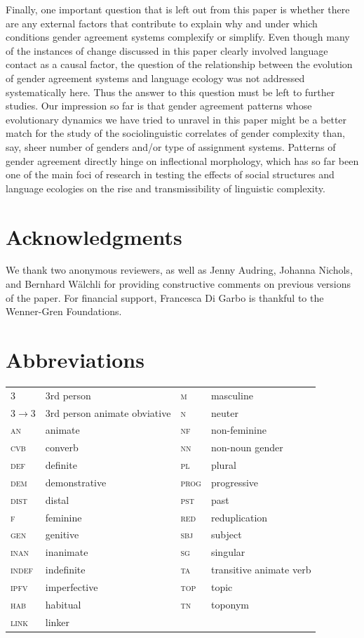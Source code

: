 \documentclass[output=collectionpaper]{langsci/langscibook}
\begin{document}
Finally, one important question that is left out from this paper is whether there are any external factors that contribute to explain why and under which conditions gender agreement systems complexify or simplify. Even though many of the instances of change discussed in this paper clearly involved language contact as a causal factor, the question of the relationship between the evolution of gender agreement systems and language ecology  was not addressed systematically here. Thus the answer to this question must be left to further studies. Our impression so far is that gender agreement patterns \textendash{} whose evolutionary dynamics we have tried to unravel in this paper \textendash{} might be a better match for the study of the sociolinguistic correlates of gender complexity than, say, sheer number of genders and/or type of assignment systems. Patterns of gender agreement directly hinge on inflectional morphology, which has so far been one of the main foci of research in testing the effects of social structures and language ecologies on the rise and transmissibility of linguistic complexity.



\section*{Acknowledgments}
We thank two anonymous reviewers, as well as Jenny Audring, Johanna Nichols, and Bernhard W\"alchli for providing constructive comments on previous versions of the paper. For financial support, Francesca Di Garbo is thankful to the Wenner-Gren Foundations.

\section*{Abbreviations}
\begin{tabularx}{\textwidth}{@{}lXlX@{}}
  3	&	3rd person	&	\textsc{m}	&	masculine	\\
  3$ \rightarrow $3	&	3rd person animate obviative	&	\textsc{n}	&	neuter	\\
  \textsc{an}	&	animate	&	\textsc{nf}	&	non-feminine	\\
  \textsc{cvb}	&	converb	&	\textsc{nn}	&	non-noun gender	\\
  \textsc{def}	&	definite	&	\textsc{pl}	&	plural	\\
  \textsc{dem}	&	demonstrative	&	\textsc{prog}	&	progressive	\\
  \textsc{dist}	&	distal	&	\textsc{pst}	&	past	\\
  \textsc{f}	&	feminine	&	\textsc{red}	&	reduplication	\\
  \textsc{gen}	&	genitive	&	\textsc{sbj}	&	subject	\\
  \textsc{inan}	&	inanimate	&	\textsc{sg}	&	singular	\\
  \textsc{indef}	&	indefinite	&	\textsc{ta}	&	transitive animate verb	\\
  \textsc{ipfv}	&	imperfective	&	\textsc{top}	&	topic	\\
  \textsc{hab}	&	habitual	&	\textsc{tn}	&	toponym	\\
  \textsc{link}	&	linker	&		&		\\
\end{tabularx}
\end{document}
